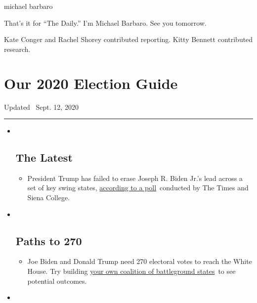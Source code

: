 michael barbaro

That's it for ``The Daily.'' I'm Michael Barbaro. See you tomorrow.

Kate Conger and Rachel Shorey contributed reporting. Kitty Bennett
contributed research.

\hypertarget{our-2020-election-guide}{%
\section{Our 2020 Election Guide}\label{our-2020-election-guide}}

Updated ~Sept. 12, 2020

\begin{center}\rule{0.5\linewidth}{\linethickness}\end{center}

\begin{itemize}
\item ~
  \hypertarget{the-latest}{%
  \subsection{The Latest}\label{the-latest}}

  \begin{itemize}
  \item
    President Trump has failed to erase Joseph R. Biden Jr.'s lead
    across a set of key swing states,
    \href{https://www.nytimes3xbfgragh.onion/2020/09/12/us/politics/biden-trump-poll-wisconsin-minnesota.html?action=click\&pgtype=Article\&state=default\&region=BELOW_MAIN_CONTENT\&context=storylines_guide}{according
    to a poll}~conducted by The Times and Siena College.
  \end{itemize}
\item ~
  \hypertarget{paths-to-270}{%
  \subsection{Paths to 270}\label{paths-to-270}}

  \begin{itemize}
  \item
    Joe Biden and Donald Trump need 270 electoral votes to reach the
    White House. Try building
    \href{https://www.nytimes3xbfgragh.onion/interactive/2020/us/elections/election-states-biden-trump.html?action=click\&pgtype=Article\&state=default\&region=BELOW_MAIN_CONTENT\&context=storylines_guide}{your
    own coalition of battleground states}~to see potential outcomes.
  \end{itemize}
\item ~
  \hypertarget{voting-deadlines}{%
}
\end{itemize}
